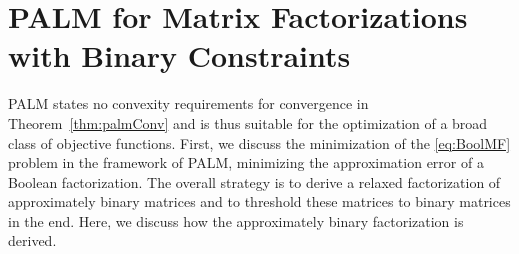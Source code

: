 \section{PALM for Matrix Factorizations with Binary Constraints}
PALM states no convexity requirements for convergence in Theorem~\ref{thm:palmConv} and is thus suitable for the optimization of a broad class of objective functions. First, we discuss the minimization of the \ref{eq:BoolMF} problem in the framework of PALM, minimizing the approximation error of a Boolean factorization. The overall strategy is to derive a relaxed factorization of approximately binary matrices and to threshold these matrices to binary matrices in the end. Here, we discuss how the approximately binary factorization is derived. 
